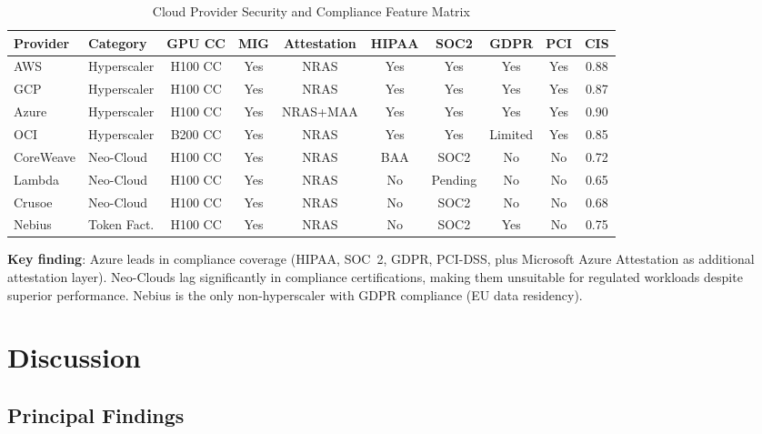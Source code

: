 \documentclass[conference,10pt]{IEEEtran}
\begin{document}
\begin{table}[!htbp]
\caption{Cloud Provider Security and Compliance Feature Matrix}
\label{tab:cloudcomp}
\centering\footnotesize
\begin{tabular}{@{}llcccccccc@{}}
\toprule
\textbf{Provider} & \textbf{Category} & \textbf{GPU CC} & \textbf{MIG} & \textbf{Attestation} & \textbf{HIPAA} & \textbf{SOC2} & \textbf{GDPR} & \textbf{PCI} & \textbf{CIS} \\
\midrule
AWS & Hyperscaler & H100 CC & Yes & NRAS & Yes & Yes & Yes & Yes & 0.88 \\
GCP & Hyperscaler & H100 CC & Yes & NRAS & Yes & Yes & Yes & Yes & 0.87 \\
Azure & Hyperscaler & H100 CC & Yes & NRAS+MAA & Yes & Yes & Yes & Yes & 0.90 \\
OCI & Hyperscaler & B200 CC & Yes & NRAS & Yes & Yes & Limited & Yes & 0.85 \\
\midrule
CoreWeave & Neo-Cloud & H100 CC & Yes & NRAS & BAA & SOC2 & No & No & 0.72 \\
Lambda & Neo-Cloud & H100 CC & Yes & NRAS & No & Pending & No & No & 0.65 \\
Crusoe & Neo-Cloud & H100 CC & Yes & NRAS & No & SOC2 & No & No & 0.68 \\
Nebius & Token Fact. & H100 CC & Yes & NRAS & No & SOC2 & Yes & No & 0.75 \\
\bottomrule
\end{tabular}
\end{table}

\textbf{Key finding}: Azure leads in compliance coverage (HIPAA, SOC~2, GDPR, PCI-DSS, plus Microsoft Azure Attestation as additional attestation layer). Neo-Clouds lag significantly in compliance certifications, making them unsuitable for regulated workloads despite superior performance. Nebius is the only non-hyperscaler with GDPR compliance (EU data residency).

\section{Discussion}
\label{sec:disc}

\subsection{Principal Findings}
\end{document}
